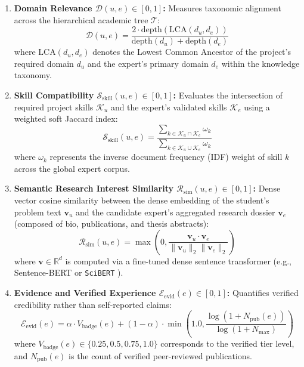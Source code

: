 \documentclass[11pt,a4paper]{article}
\begin{document}
\begin{enumerate}[label=\textbf{\arabic*.}]
    \item \textbf{Domain Relevance $\mathcal{D}(u, e) \in [0, 1]$:} Measures taxonomic alignment across the hierarchical academic tree $\mathcal{T}$:
    \begin{equation}
        \mathcal{D}(u, e) = \frac{2 \cdot \text{depth}(\text{LCA}(d_u, d_e))}{\text{depth}(d_u) + \text{depth}(d_e)}
    \end{equation}
    where $\text{LCA}(d_u, d_e)$ denotes the Lowest Common Ancestor of the project's required domain $d_u$ and the expert's primary domain $d_e$ within the knowledge taxonomy.

    \item \textbf{Skill Compatibility $\mathcal{S}_{\text{skill}}(u, e) \in [0, 1]$:} Evaluates the intersection of required project skills $\mathcal{K}_u$ and the expert's validated skills $\mathcal{K}_e$ using a weighted soft Jaccard index:
    \begin{equation}
        \mathcal{S}_{\text{skill}}(u, e) = \frac{\sum_{k \in \mathcal{K}_u \cap \mathcal{K}_e} \omega_k}{\sum_{k \in \mathcal{K}_u \cup \mathcal{K}_e} \omega_k}
    \end{equation}
    where $\omega_k$ represents the inverse document frequency (IDF) weight of skill $k$ across the global expert corpus.

    \item \textbf{Semantic Research Interest Similarity $\mathcal{R}_{\text{sim}}(u, e) \in [0, 1]$:} Dense vector cosine similarity between the dense embedding of the student's problem text $\mathbf{v}_u$ and the candidate expert's aggregated research dossier $\mathbf{v}_e$ (composed of bio, publications, and thesis abstracts):
    \begin{equation}
        \mathcal{R}_{\text{sim}}(u, e) = \max\left(0, \frac{\mathbf{v}_u \cdot \mathbf{v}_e}{\|\mathbf{v}_u\|_2 \|\mathbf{v}_e\|_2}\right)
    \end{equation}
    where $\mathbf{v} \in \mathbb{R}^{d}$ is computed via a fine-tuned dense sentence transformer (e.g., Sentence-BERT \cite{reimers2019sentence} or \texttt{SciBERT} \cite{beltagy2019scibert}).

    \item \textbf{Evidence and Verified Experience $\mathcal{E}_{\text{evid}}(e) \in [0, 1]$:} Quantifies verified credibility rather than self-reported claims:
    \begin{equation}
        \mathcal{E}_{\text{evid}}(e) = \alpha \cdot V_{\text{badge}}(e) + (1 - \alpha) \cdot \min\left(1.0, \frac{\log(1 + N_{\text{pub}}(e))}{\log(1 + N_{\text{max}})}\right)
    \end{equation}
    where $V_{\text{badge}}(e) \in \{0.25, 0.5, 0.75, 1.0\}$ corresponds to the verified tier level, and $N_{\text{pub}}(e)$ is the count of verified peer-reviewed publications.


\end{enumerate}
\end{document}

